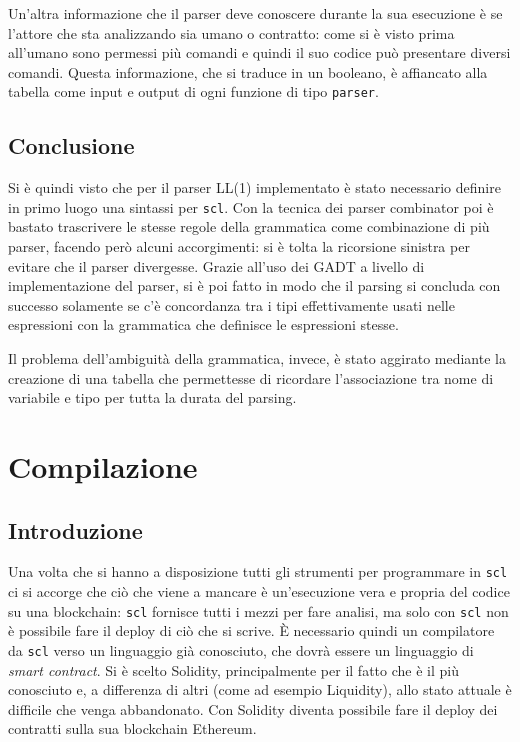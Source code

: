 \documentclass[12pt,a4paper]{report}
\begin{document}
Un'altra informazione che il parser deve conoscere durante la sua
esecuzione è se l'attore che sta analizzando sia umano o contratto: come
si è visto prima all'umano sono permessi più comandi e quindi il suo
codice può presentare diversi comandi. Questa informazione, che si
traduce in un booleano, è affiancato alla tabella come input e output di
ogni funzione di tipo \texttt{parser}.

\hypertarget{conclusione-2}{%
\section{Conclusione}\label{conclusione-2}}

Si è quindi visto che per il parser LL(1) implementato è stato
necessario definire in primo luogo una sintassi per \texttt{scl}. Con la
tecnica dei parser combinator poi è bastato trascrivere le stesse regole
della grammatica come combinazione di più parser, facendo però alcuni
accorgimenti: si è tolta la ricorsione sinistra per evitare che il
parser divergesse. Grazie all'uso dei GADT a livello di implementazione
del parser, si è poi fatto in modo che il parsing si concluda con
successo solamente se c'è concordanza tra i tipi effettivamente usati
nelle espressioni con la grammatica che definisce le espressioni stesse.

Il problema dell'ambiguità della grammatica, invece, è stato aggirato
mediante la creazione di una tabella che permettesse di ricordare
l'associazione tra nome di variabile e tipo per tutta la durata del
parsing.

\newpage

\hypertarget{compilazione}{%
\chapter{Compilazione}\label{compilazione}}

\hypertarget{introduzione-4}{%
\section{Introduzione}\label{introduzione-4}}

Una volta che si hanno a disposizione tutti gli strumenti per
programmare in \texttt{scl} ci si accorge che ciò che viene a mancare è
un'esecuzione vera e propria del codice su una blockchain: \texttt{scl}
fornisce tutti i mezzi per fare analisi, ma solo con \texttt{scl} non è
possibile fare il deploy di ciò che si scrive. È necessario quindi un
compilatore da \texttt{scl} verso un linguaggio già conosciuto, che
dovrà essere un linguaggio di \emph{smart contract}. Si è scelto
Solidity, principalmente per il fatto che è il più conosciuto e, a
differenza di altri (come ad esempio Liquidity), allo stato attuale è
difficile che venga abbandonato. Con Solidity diventa possibile fare il
deploy dei contratti sulla sua blockchain Ethereum.
\end{document}
